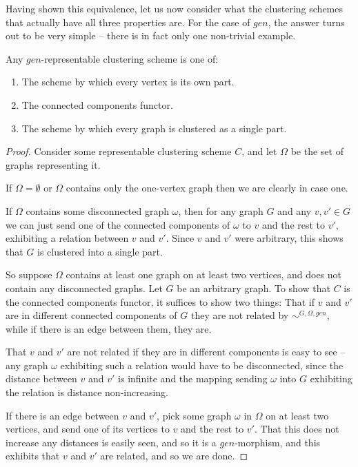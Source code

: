 \documentclass[a4paper,reqno,oneside]{article} %
\begin{document}
Having shown this equivalence, let us now consider what the clustering schemes that actually have all three properties are. For the case of $gen$, the answer turns out to be very simple -- there is in fact only one non-trivial example.

\begin{theorem}\label{classifying_gen_representable}
Any $gen$-representable clustering scheme is one of:
\begin{enumerate}
    \item The scheme by which every vertex is its own part.
    \item The connected components functor.
    \item The scheme by which every graph is clustered as a single part.
\end{enumerate}
\begin{proof}
Consider some representable clustering scheme $C$, and let $\Omega$ be the set of graphs representing it.

If $\Omega = \emptyset$ or $\Omega$ contains only the one-vertex graph then we are clearly in case one.

If $\Omega$ contains some disconnected graph $\omega$, then for any graph $G$ and any $v, v' \in G$ we can just send one of the connected components of $\omega$ to $v$ and the rest to $v'$, exhibiting a relation between $v$ and $v'$. Since $v$ and $v'$ were arbitrary, this shows that $G$ is clustered into a single part.

So suppose $\Omega$ contains at least one graph on at least two vertices, and does not contain any disconnected graphs. Let $G$ be an arbitrary graph. To show that $C$ is the connected components functor, it suffices to show two things: That if $v$ and $v'$ are in different connected components of $G$ they are not related by $\sim^{G,\Omega,gen}$, while if there is an edge between them, they are.

That $v$ and $v'$ are not related if they are in different components is easy to see -- any graph $\omega$ exhibiting such a relation would have to be disconnected, since the distance between $v$ and $v'$ is infinite and the mapping sending $\omega$ into $G$ exhibiting the relation is distance non-increasing.

If there is an edge between $v$ and $v'$, pick some graph $\omega$ in $\Omega$ on at least two vertices, and send one of its vertices to $v$ and the rest to $v'$. That this does not increase any distances is easily seen, and so it is a $gen$-morphism, and this exhibits that $v$ and $v'$ are related, and so we are done.
\end{proof}
\end{theorem}
\end{document}

